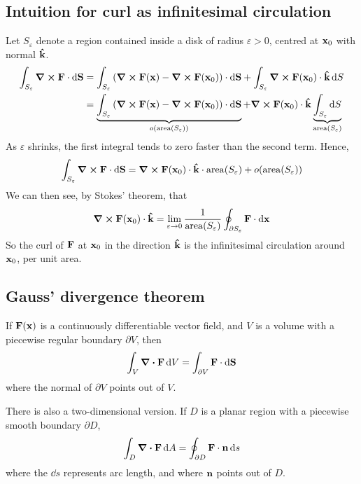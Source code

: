 \subsection{Intuition for curl as infinitesimal circulation}
Let \(S_\varepsilon\) denote a region contained inside a disk of radius \(\varepsilon > 0\), centred at \(\vb x_0\) with normal \(\vu{k}\).
\begin{align*}
	\int_{S_\varepsilon} \curl{\vb F} \cdot \dd{\vb S} & = \int_{S_\varepsilon} \left( \curl{\vb F(\vb x)} - \curl{\vb F(\vb x_0)} \right) \cdot \dd{\vb S} + \int_{S_\varepsilon} \curl{\vb F(\vb x_0)} \cdot \vu k \dd{S}                                                                                            \\
	                                                   & = \underbrace{\int_{S_\varepsilon} \left( \curl{\vb F(\vb x)} - \curl{\vb F(\vb x_0)} \right) \cdot \dd{\vb S}}_{o(\mathrm{area}(S_\varepsilon))} + \curl{\vb F(\vb x_0)} \cdot \vu k \underbrace{\int_{S_\varepsilon} \dd{S}}_{\mathrm{area}(S_\varepsilon)} \\
\end{align*}
As \(\varepsilon\) shrinks, the first integral tends to zero faster than the second term.
Hence,
\[
	\int_{S_\varepsilon} \curl{\vb F} \cdot \dd{\vb S} =  \curl{\vb F(\vb x_0)} \cdot \vu k \cdot \mathrm{area}(S_\varepsilon) + o(\mathrm{area}(S_\varepsilon))
\]
We can then see, by Stokes' theorem, that
\[
	\curl{\vb F(\vb x_0)} \cdot \vu k = \lim_{\varepsilon \to 0} \frac{1}{\mathrm{area}(S_\varepsilon)} \oint_{\partial S_\varepsilon} \vb F \cdot \dd{\vb x}
\]
So the curl of \(\vb F\) at \(\vb x_0\) in the direction \(\vu k\) is the infinitesimal circulation around \(\vb x_0\), per unit area.

\subsection{Gauss' divergence theorem}
\begin{proposition}
	If \(\vb F(\vb x)\) is a continuously differentiable vector field, and \(V\) is a volume with a piecewise regular boundary \(\partial V\), then
	\[
		\int_V \div{\vb F} \dd{V} = \int_{\partial V} \vb F \cdot \dd{\vb S}
	\]
	where the normal of \(\partial V\) points out of \(V\).
\end{proposition}
\noindent There is also a two-dimensional version.
If \(D\) is a planar region with a piecewise smooth boundary \(\partial D\),
\[
	\int_D \div{\vb F} \dd{A} = \oint_{\partial D} \vb F \cdot \vb n \dd{s}
\]
where the \(\dd{s}\) represents arc length, and where \(\vb n\) points out of \(D\).

